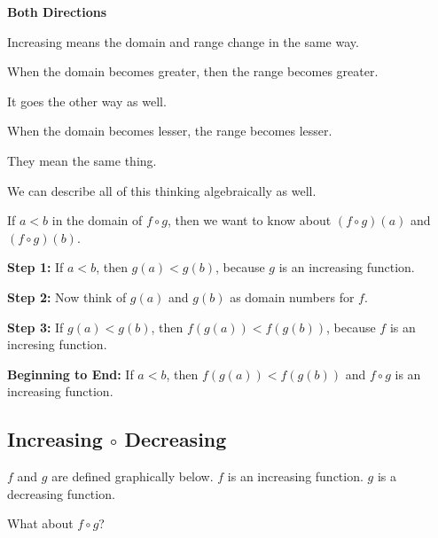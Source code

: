 \documentclass{ximera}
\begin{document}
\begin{warning} \textbf{\textcolor{red!70!black}{Both Directions}}

Increasing means the domain and range change in the same way.

When the domain becomes greater, then the range becomes greater.

It goes the other way as well.

When the domain becomes lesser, the range becomes lesser.

They mean the same thing.


\end{warning}



We can describe all of this thinking algebraically as well. 


If $a < b$ in the domain of $f \circ g$, then we want to know about $(f \circ g)(a)$  and $(f \circ g)(b)$.



\textbf{Step 1:}  If $a < b$, then $g(a) < g(b)$, because $g$ is an increasing function.


\textbf{Step 2:}  Now think of $g(a)$  and $g(b)$ as domain numbers for $f$.


\textbf{Step 3:}  If $g(a) < g(b)$, then $f(g(a)) < f(g(b))$, because $f$ is an incresing function.


\textbf{Beginning to End:} If $a < b$, then $f(g(a)) < f(g(b))$ and $f \circ g$ is an increasing function.




















\subsection*{Increasing $\circ$ Decreasing}



$f$ and $g$ are defined graphically below.  $f$ is an increasing function.  $g$ is a decreasing function. 

What about $f \circ g$? 
\end{document}
